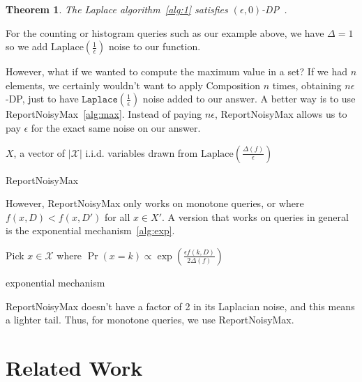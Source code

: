 \documentclass[11pt]{report}
\newtheorem{theorem}{Theorem}
\renewcommand{\t}[1]{\texttt{#1}}
\begin{document}
\begin{theorem}
The Laplace algorithm~\ref{alg:1} satisfies $(\epsilon, 0)$-DP~\cite{Dwork:2006}.
\end{theorem}
For the counting or histogram queries such as our example above, we have $\Delta = 1$ so we add $\text{Laplace}\left(\frac{1}{\epsilon}\right)$ noise to our function.

However, what if we wanted to compute the maximum value in a set? If we had $n$ elements, we certainly wouldn't want to apply Composition $n$ times, obtaining $n\epsilon$-DP, just to have $\t{Laplace}\left(\frac{1}{\epsilon}\right)$ noise added to our answer. A better way is to use ReportNoisyMax~\ref{alg:max}. Instead of paying $n\epsilon$, ReportNoisyMax allows us to pay $\epsilon$ for the exact same noise on our answer.
\begin{algorithm}\label{alg:max}
\SetAlgoLined
{}
$X$, a vector of $|\mathcal{X}|$ i.i.d. variables drawn from $\text{Laplace}\left(\frac{\Delta(f)}{\epsilon}\right)$\;
\caption{ReportNoisyMax}
\end{algorithm}
However, ReportNoisyMax only works on monotone queries, or where $f(x, D) < f(x, D')$ for all $x \in X'$. A version that works on queries in general is the exponential mechanism~\ref{alg:exp}.
\begin{algorithm}\label{alg:exp}
\SetAlgoLined
{}
Pick $x \in \mathcal{X}$ where $\Pr(x=k) \propto \exp\left(\frac{\epsilon f(k, D)}{2\Delta(f)}\right)$\;
\caption{exponential mechanism}
\end{algorithm}
ReportNoisyMax doesn't have a factor of 2 in its Laplacian noise, and this means a lighter tail. Thus, for monotone queries, we use ReportNoisyMax.
\section{Related Work}
\end{document}
